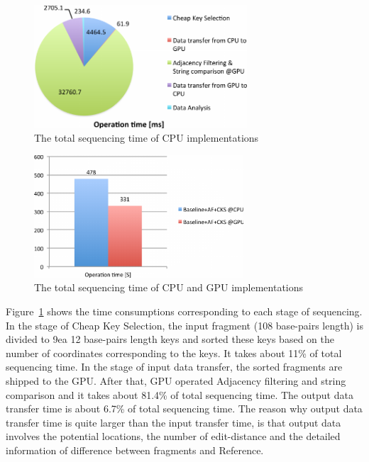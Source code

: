 \begin{figure}[t] \centering
\vspace{0.1in}
\includegraphics[height=1.8in]{./figure/GPU_portion_B.pdf} \vspace{-0.2in}
\caption{The total sequencing time of CPU implementations}
\label{fig:gpu_portion} \end{figure}
\begin{figure}[b] \centering
\vspace{0.15in}
\includegraphics[height=1.8in]{./figure/GPU_Result_B.pdf} \vspace{0in}
\caption{The total sequencing time of CPU and GPU implementations}
\label{fig:gpu_result} \end{figure}

Figure~\ref{fig:gpu_portion} shows the time consumptions corresponding to each stage of
sequencing. In the stage of Cheap Key Selection, the input fragment (108
base-pairs length) is divided to 9ea 12 base-pairs length keys and sorted these
keys based on the number of coordinates corresponding to the keys. It takes
about 11\% of total sequencing time. In the stage of input data transfer, the
sorted fragments are shipped to the GPU.  After that, GPU operated Adjacency
filtering and string comparison and it takes about 81.4\% of total sequencing
time. The output data transfer time is about 6.7\% of total sequencing time. The
reason why output data transfer time is quite larger than the input transfer
time, is that output data involves the potential locations, the number of
edit-distance and the detailed information of difference between fragments and
Reference.\\
